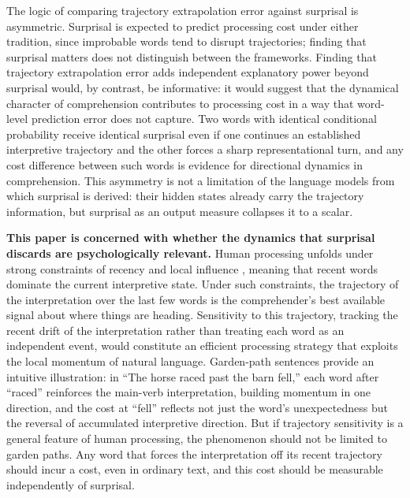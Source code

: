 \documentclass[12pt]{article}
\newcommand{\new}[1]{{\bfseries #1}}
\begin{document}
The logic of comparing trajectory extrapolation error against surprisal is asymmetric. Surprisal is expected to predict processing cost under either tradition, since improbable words tend to disrupt trajectories; finding that surprisal matters does not distinguish between the frameworks. Finding that trajectory extrapolation error adds independent explanatory power beyond surprisal would, by contrast, be informative: it would suggest that the dynamical character of comprehension contributes to processing cost in a way that word-level prediction error does not capture. Two words with identical conditional probability receive identical surprisal even if one continues an established interpretive trajectory and the other forces a sharp representational turn, and any cost difference between such words is evidence for directional dynamics in comprehension. This asymmetry is not a limitation of the language models from which surprisal is derived: their hidden states already carry the trajectory information, but surprisal as an output measure collapses it to a scalar.

\new{This paper is concerned with whether the dynamics that surprisal discards are psychologically relevant.} Human processing unfolds under strong constraints of recency and local influence \citep{gibson1998,lewis2005}, meaning that recent words dominate the current interpretive state. Under such constraints, the trajectory of the interpretation over the last few words is the comprehender's best available signal about where things are heading. Sensitivity to this trajectory, tracking the recent drift of the interpretation rather than treating each word as an independent event, would constitute an efficient processing strategy that exploits the local momentum of natural language. Garden-path sentences provide an intuitive illustration: in ``The horse raced past the barn fell,'' each word after ``raced'' reinforces the main-verb interpretation, building momentum in one direction, and the cost at ``fell'' reflects not just the word's unexpectedness but the reversal of accumulated interpretive direction. But if trajectory sensitivity is a general feature of human processing, the phenomenon should not be limited to garden paths. Any word that forces the interpretation off its recent trajectory should incur a cost, even in ordinary text, and this cost should be measurable independently of surprisal.
\end{document}
